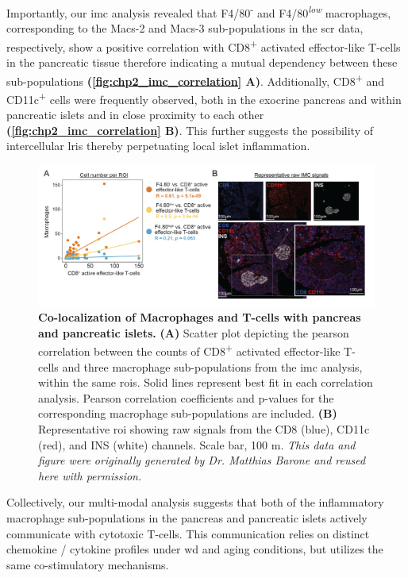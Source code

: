 Importantly, our \gls{imc} analysis revealed that F4/80\textsuperscript{-} and F4/80\textsuperscript{\textit{low}} macrophages, corresponding to the Macs-2 and Macs-3 sub-populations in the \gls{scr} data, respectively, show a positive correlation with CD8\textsuperscript{+} activated effector-like T-cells in the pancreatic tissue therefore indicating a mutual dependency between these sub-populations \textbf{(\autoref{fig:chp2_imc_correlation} A)}. Additionally, CD8\textsuperscript{+} and CD11c\textsuperscript{+} cells were frequently observed, both in the exocrine pancreas and within pancreatic islets and in close proximity to each other \textbf{(\autoref{fig:chp2_imc_correlation} B)}. This further suggests the possibility of intercellular \gls{lri}s thereby perpetuating local islet inflammation.\\


\begin{figure}[t!]
\centering
\includegraphics[width=\linewidth]{Chapter4/Fig/F2-8-01.png}
\caption[Co-localization of macrophages and T-cells with pancreas]{\textbf{Co-localization of Macrophages and T-cells with pancreas and pancreatic islets.} \textbf{(A)} Scatter plot depicting the pearson correlation between the counts of CD8\textsuperscript{+} activated effector-like T-cells and three macrophage sub-populations from the \gls{imc} analysis, within the same \glspl{roi}. Solid lines represent best fit in each correlation analysis. Pearson correlation coefficients and p-values for the corresponding macrophage sub-populations are included. \textbf{(B)} Representative \gls{roi} showing raw signals from the CD8 (blue), CD11c (red), and INS (white) channels. Scale bar, 100 \textmu m. \textit{This data and figure were originally generated by Dr. Matthias Barone and reused here with permission.}}
\label{fig:chp2_imc_correlation}

\end{figure}

\par Collectively, our multi-modal analysis suggests that both of the inflammatory macrophage sub-populations in the pancreas and pancreatic islets actively communicate with cytotoxic T-cells. This communication relies on distinct chemokine / cytokine profiles under \gls{wd} and aging conditions, but utilizes the same co-stimulatory mechanisms.

